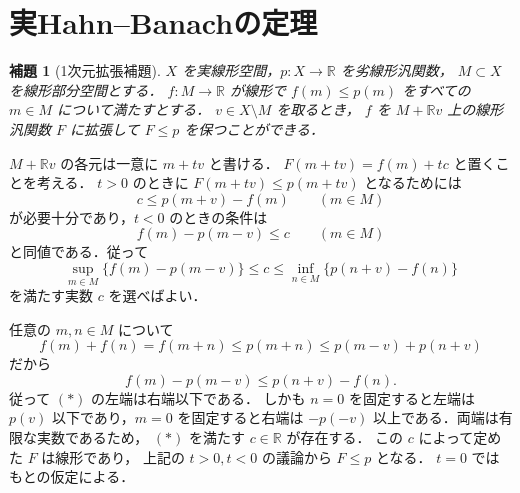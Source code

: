 \documentclass[a5paper,10pt,onecolumn]{jsarticle}
\makeatletter
\theoremstyle{mathnotetheorem}
\newtheorem{lemma}[theorem]{補題}
\renewcommand{\proofname}{証明}
\renewenvironment{proof}[1][\proofname]{%
  \par\pushQED{\qed}\normalfont\topsep4\p@\@plus2\p@\relax
  \trivlist\item[\hskip\labelsep\bfseries #1]\ignorespaces
}{\popQED\endtrivlist\@endpefalse}
\makeatother
\begin{document}
\section{実Hahn--Banachの定理}

\begin{lemma}[1次元拡張補題]\label{lem:onedim}
$X$ を実線形空間，$p:X\to\mathbb R$ を劣線形汎関数，
$M\subset X$ を線形部分空間とする．
$f:M\to\mathbb R$ が線形で $f(m)\le p(m)$
をすべての $m\in M$ について満たすとする．
$v\in X\setminus M$ を取るとき，
$f$ を $M+\mathbb Rv$ 上の線形汎関数 $F$ に拡張して
$F\le p$ を保つことができる．
\end{lemma}
\begin{proof}
$M+\mathbb Rv$ の各元は一意に $m+tv$ と書ける．
$F(m+tv)=f(m)+tc$ と置くことを考える．
$t>0$ のときに $F(m+tv)\le p(m+tv)$ となるためには
\[
 c\le p(m+v)-f(m)\qquad(m\in M)
\]
が必要十分であり，$t<0$ のときの条件は
\[
 f(m)-p(m-v)\le c\qquad(m\in M)
\]
と同値である．従って
\[
 \sup_{m\in M}\{f(m)-p(m-v)\}
 \le c\le
 \inf_{n\in M}\{p(n+v)-f(n)\}
 \tag{$*$}
\]
を満たす実数 $c$ を選べばよい．

任意の $m,n\in M$ について
\[
 f(m)+f(n)=f(m+n)\le p(m+n)
 \le p(m-v)+p(n+v)
\]
だから
\[
 f(m)-p(m-v)\le p(n+v)-f(n).
\]
従って $(*)$ の左端は右端以下である．
しかも $n=0$ を固定すると左端は
$p(v)$ 以下であり，$m=0$ を固定すると右端は
$-p(-v)$ 以上である．両端は有限な実数であるため，
$(*)$ を満たす $c\in\mathbb R$ が存在する．
この $c$ によって定めた $F$ は線形であり，
上記の $t>0,t<0$ の議論から $F\le p$ となる．
$t=0$ ではもとの仮定による．
\end{proof}
\end{document}
